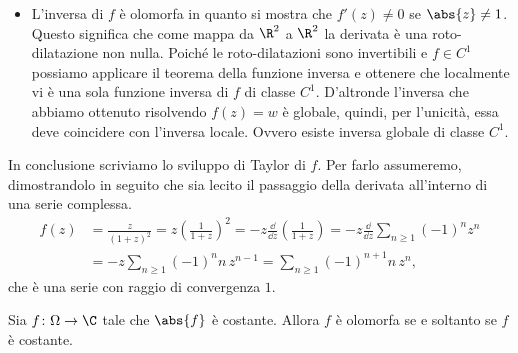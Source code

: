 \begin{ese}
\begin{itemize}
		\item L'inversa di \(f\) è olomorfa in quanto si mostra che \(f'(z) \neq 0\) se \(\abs{z}\neq 1\).
		      Questo significa che come mappa da \(\R^2\) a \(\R^2\) la derivata è una roto-dilatazione non nulla.
		      Poiché le roto-dilatazioni sono invertibili e \(f\in C^1\) possiamo applicare il teorema della funzione inversa e ottenere che localmente vi è una sola funzione inversa di \(f\) di classe \(C^1\).
		      D'altronde l'inversa che abbiamo ottenuto risolvendo \(f(z)=w\) è globale, quindi, per l'unicità, essa deve coincidere con l'inversa locale.
		      Ovvero esiste inversa globale di classe \(C^1\).
	\end{itemize}
	In conclusione scriviamo lo sviluppo di Taylor di \(f\).
	Per farlo assumeremo, dimostrandolo in seguito che sia lecito il passaggio della derivata all'interno di una serie complessa.
	\[
		\begin{split}
			f(z) & = \frac{z}{(1+z)^2} = z \left( \frac{1}{1+z} \right)^2 = -z \frac{\dd}{\dd z}\left( \frac{1}{1+z} \right) = -z \frac{\dd}{\dd z} \sum_{n\ge 1} (-1)^n z^n\\
			& = -z \sum_{n\ge 1} (-1)^n n\,z^{n-1} = \sum_{n\ge 1} (-1)^{n+1}n\,z^n,
		\end{split}
	\]
	che è una serie con raggio di convergenza \(1\).
\end{ese}

\begin{exeN}[Esercitazione 04/10]
	Sia \(f\colon \Omega \to \C\) tale che \(\abs{f}\) è costante.
	Allora \(f\) è olomorfa se e soltanto se \(f\) è costante.
\end{exeN}

